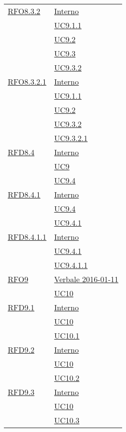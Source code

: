 \begin{longtable}{|>{\centering}m{5cm}|m{5cm}<{\centering}|}
\hyperlink{RFO8.3.2}{RFO8.3.2} & \hyperlink{Interno}{Interno}\\
& \hyperref[UC9.1.1]{UC9.1.1}\\
& \hyperref[UC9.2]{UC9.2}\\
& \hyperref[UC9.3]{UC9.3}\\
& \hyperref[UC9.3.2]{UC9.3.2}\\ \hline

\hyperlink{RFO8.3.2.1}{RFO8.3.2.1} & \hyperlink{Interno}{Interno}\\
& \hyperref[UC9.1.1]{UC9.1.1}\\
& \hyperref[UC9.2]{UC9.2}\\
& \hyperref[UC9.3.2]{UC9.3.2}\\
& \hyperref[UC9.3.2.1]{UC9.3.2.1}\\ \hline

\hyperlink{RFD8.4}{RFD8.4} & \hyperlink{Interno}{Interno}\\
& \hyperref[UC9]{UC9}\\
& \hyperref[UC9.4]{UC9.4}\\ \hline

\hyperlink{RFD8.4.1}{RFD8.4.1} & \hyperlink{Interno}{Interno}\\
& \hyperref[UC9.4]{UC9.4}\\
& \hyperref[UC9.4.1]{UC9.4.1}\\ \hline

\hyperlink{RFD8.4.1.1}{RFD8.4.1.1} & \hyperlink{Interno}{Interno}\\
& \hyperref[UC9.4.1]{UC9.4.1}\\
& \hyperref[UC9.4.1.1]{UC9.4.1.1}\\ \hline

\hyperlink{RFO9}{RFO9} & \hyperlink{Verbale 2016-01-11}{Verbale 2016-01-11}\\
& \hyperref[UC10]{UC10}\\ \hline

\hyperlink{RFD9.1}{RFD9.1} & \hyperlink{Interno}{Interno}\\
& \hyperref[UC10]{UC10}\\
& \hyperref[UC10.1]{UC10.1}\\ \hline

\hyperlink{RFD9.2}{RFD9.2} & \hyperlink{Interno}{Interno}\\
& \hyperref[UC10]{UC10}\\
& \hyperref[UC10.2]{UC10.2}\\ \hline

\hyperlink{RFD9.3}{RFD9.3} & \hyperlink{Interno}{Interno}\\
& \hyperref[UC10]{UC10}\\
& \hyperref[UC10.3]{UC10.3}\\ \hline


\end{longtable}
